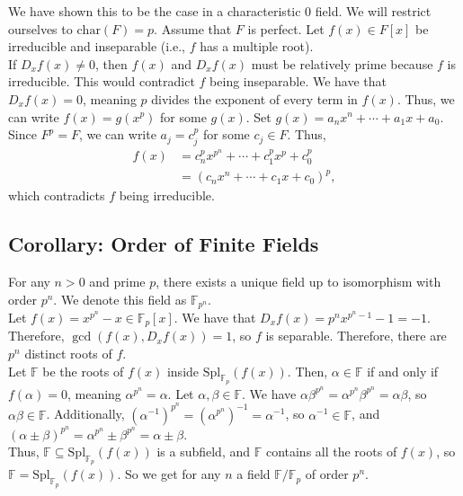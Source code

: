 \documentclass[10pt]{extarticle}
\begin{document}
  We have shown this to be the case in a characteristic $0$ field. We will restrict ourselves to $\text{char}(F) = p$. Assume that $F$ is perfect. Let $f(x)\in F[x]$ be irreducible and inseparable (i.e., $f$ has a multiple root).\\

  If $D_xf(x) \neq 0$, then $f(x)$ and $D_xf(x)$ must be relatively prime because $f$ is irreducible. This would contradict $f$ being inseparable. We have that $D_xf(x) = 0$, meaning $p$ divides the exponent of every term in $f(x)$. Thus, we can write $f(x) = g(x^p)$ for some $g(x)$. Set $g(x) = a_nx^n + \cdots + a_1x + a_0$. Since $F^p = F$, we can write $a_j = c_j^p$ for some $c_j \in F$. Thus, 
  \begin{align*}
    f(x) &= c_n^px^{p^n} + \cdots + c_1^px^p + c_0^p\\
         &= (c_nx^n + \cdots + c_1x + c_0)^p,
  \end{align*}
  which contradicts $f$ being irreducible.
  \subsection{Corollary: Order of Finite Fields}%
  For any $n > 0$ and prime $p$, there exists a unique field up to isomorphism with order $p^n$. We denote this field as $\mathbb{F}_{p^n}$.\\

  Let $f(x) = x^{p^n} - x\in \mathbb{F}_p[x]$. We have that $D_xf(x) = p^nx^{p^n-1}-1 = -1$. Therefore, $\gcd(f(x),D_xf(x)) = 1$, so $f$ is separable. Therefore, there are $p^n$ distinct roots of $f$.\\

  Let $\mathbb{F}$ be the roots of $f(x)$ inside $\text{Spl}_{\mathbb{F}_p}(f(x))$. Then, $\alpha\in \mathbb{F}$ if and only if $f(\alpha) = 0$, meaning $\alpha^{p^n} = \alpha$. Let $\alpha,\beta \in \mathbb{F}$. We have $\alpha\beta^{p^n} = \alpha^{p^n}\beta^{p^n} = \alpha\beta$, so $\alpha\beta \in \mathbb{F}$. Additionally, $\left(\alpha^{-1}\right)^{p^n} = \left(\alpha^{p^n}\right)^{-1} = \alpha^{-1}$, so $\alpha^{-1} \in \mathbb{F}$, and $(\alpha \pm \beta)^{p^n} = \alpha^{p^n} \pm \beta^{p^n} = \alpha \pm \beta$.\\

  Thus, $\mathbb{F}\subseteq \text{Spl}_{\mathbb{F}_p}(f(x))$ is a subfield, and $\mathbb{F}$ contains all the roots of $f(x)$, so $\mathbb{F} = \text{Spl}_{\mathbb{F}_p}(f(x))$. So we get for any $n$ a field $\mathbb{F}/\mathbb{F}_p$ of order $p^n$.\\
\end{document}
